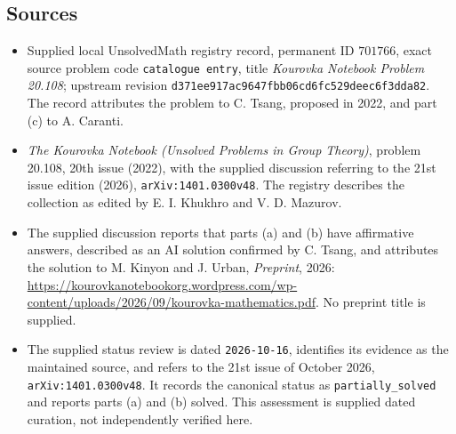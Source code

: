\documentclass[11pt]{article}
\begin{document}
\subsection{Sources}
\begin{itemize}
\item Supplied local UnsolvedMath registry record, permanent ID \(701766\), exact source problem code \texttt{catalogue entry}, title \emph{Kourovka Notebook Problem 20.108}; upstream revision \texttt{d371ee917ac9647fbb06cd6fc529deec6f3dda82}. The record attributes the problem to C. Tsang, proposed in 2022, and part (c) to A. Caranti.
\item \emph{The Kourovka Notebook (Unsolved Problems in Group Theory)}, problem 20.108, 20th issue (2022), with the supplied discussion referring to the 21st issue edition (2026), \texttt{arXiv:1401.0300v48}. The registry describes the collection as edited by E. I. Khukhro and V. D. Mazurov.
\item The supplied discussion reports that parts (a) and (b) have affirmative answers, described as an AI solution confirmed by C. Tsang, and attributes the solution to M. Kinyon and J. Urban, \emph{Preprint}, 2026: \url{https://kourovkanotebookorg.wordpress.com/wp-content/uploads/2026/09/kourovka-mathematics.pdf}. No preprint title is supplied.
\item The supplied status review is dated \texttt{2026-10-16}, identifies its evidence as the maintained source, and refers to the 21st issue of October 2026, \texttt{arXiv:1401.0300v48}. It records the canonical status as \texttt{partially\_solved} and reports parts (a) and (b) solved. This assessment is supplied dated curation, not independently verified here.
\end{itemize}
\end{document}
